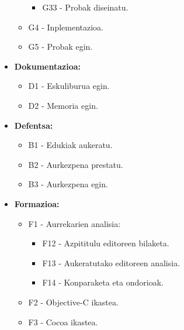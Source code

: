 \begin{itemize}
\begin{itemize}
\begin{itemize}
		\item G33 - Probak diseinatu.
		\end{itemize}
	\item G4 - Inplementazioa.
	\item G5 - Probak egin.
	\end{itemize}
\item \textbf{Dokumentazioa:}
	\begin{itemize}
	\item D1 - Eskuliburua egin.
	\item D2 - Memoria egin.
	\end{itemize}
\item \textbf{Defentsa:}
	\begin{itemize}
	\item B1 - Edukiak aukeratu.
	\item B2 - Aurkezpena prestatu.
	\item B3 - Aurkezpena egin.
	\end{itemize}
\item \textbf{Formazioa:}
	\begin{itemize}
	\item F1 - Aurrekarien analisia:
		\begin{itemize}
		\item F12 - Azpititulu editoreen bilaketa.
		\item F13 - Aukeratutako editoreen analisia.
		\item F14 - Konparaketa eta ondorioak.
		\end{itemize}
	\item F2 - Objective-C ikastea.
	\item F3 - Cocoa ikastea.
	\end{itemize}
\end{itemize}

